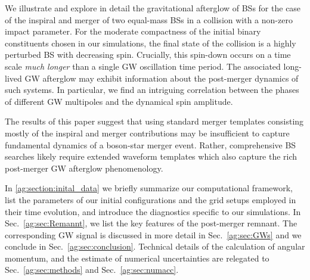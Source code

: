 We illustrate and explore in detail the gravitational afterglow
of BSs for the case of the inspiral and merger 
of two equal-mass BSs in a collision with a non-zero impact parameter. For the moderate compactness of the initial binary constituents chosen in our simulations, the final state of the collision
is a highly perturbed BS with decreasing spin. Crucially, this spin-down occurs on a time scale {\it much longer} than a single GW oscillation time period.  The associated long-lived GW afterglow may exhibit information about the post-merger dynamics of such systems. In particular, we find an intriguing correlation between the phases of different GW multipoles and the dynamical spin amplitude. 



The results of this paper suggest that using standard merger templates consisting mostly of the inspiral and merger contributions may be insufficient to capture fundamental dynamics of a boson-star merger event. Rather, comprehensive BS searches likely require extended waveform templates which also capture the rich post-merger GW afterglow phenomenology.

In \ref{ag:section:inital_data} we 
briefly summarize our computational framework, list the parameters
of our initial configurations and the grid setups employed in their
time evolution, and introduce the diagnostics specific
to our simulations. In Sec.~\ref{ag:sec:Remannt},
we list the key features of the post-merger
remnant. The corresponding GW signal is discussed in more detail
in Sec.~\ref{ag:sec:GWs} and we conclude in Sec.~\ref{ag:sec:conclusion}.
Technical details of the calculation
of angular momentum, and the estimate of numerical uncertainties
are relegated to
Sec.~\ref{ag:sec:methods} and Sec.~\ref{ag:sec:numacc}.

